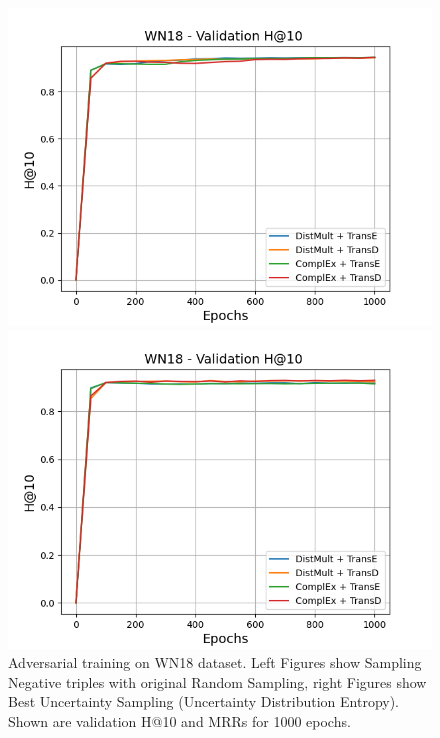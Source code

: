 \begin{figure}
\begin{minipage}{.5\textwidth}
    \end{minipage}
    \begin{minipage}{.5\textwidth}
      \centering
      \includegraphics[width=0.9\linewidth]{figures/results/gan_train/not_pretrained/random/wn18/random_wn18_hit10.png}
    \end{minipage}%
    \begin{minipage}{.5\textwidth}
      \centering
      \includegraphics[width=0.9\linewidth]{figures/results/gan_train/not_pretrained/uncertainty/max_distribution/entropy/wn18/uncertainty_wn18_hit10.png}
    \end{minipage}%
    \caption{Adversarial training on \textsc{WN18} dataset. 
    Left Figures show Sampling Negative triples with original Random Sampling, right Figures show Best Uncertainty Sampling (Uncertainty Distribution Entropy).
    Shown are validation H@10 and MRRs for 1000 epochs.}
    \label{fig:advtrain_wn18_random_vs_uncertainty}
\end{figure}






